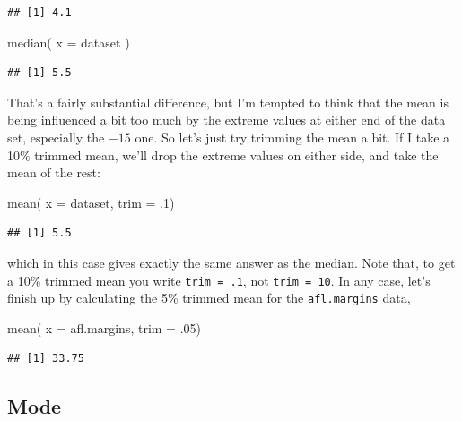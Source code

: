 \documentclass[
]{book}
\newenvironment{Shaded}{\begin{snugshade}}{\end{snugshade}}
\newcommand{\AttributeTok}[1]{\textcolor[rgb]{0.77,0.63,0.00}{#1}}
\newcommand{\DecValTok}[1]{\textcolor[rgb]{0.00,0.00,0.81}{#1}}
\newcommand{\FunctionTok}[1]{\textcolor[rgb]{0.00,0.00,0.00}{#1}}
\newcommand{\NormalTok}[1]{#1}
\begin{document}
\begin{verbatim}
## [1] 4.1
\end{verbatim}

\begin{Shaded}
\begin{Highlighting}[]
\FunctionTok{median}\NormalTok{( }\AttributeTok{x =}\NormalTok{ dataset )}
\end{Highlighting}
\end{Shaded}

\begin{verbatim}
## [1] 5.5
\end{verbatim}

That's a fairly substantial difference, but I'm tempted to think that the mean is being influenced a bit too much by the extreme values at either end of the data set, especially the \(-15\) one. So let's just try trimming the mean a bit. If I take a 10\% trimmed mean, we'll drop the extreme values on either side, and take the mean of the rest:

\begin{Shaded}
\begin{Highlighting}[]
\FunctionTok{mean}\NormalTok{( }\AttributeTok{x =}\NormalTok{ dataset, }\AttributeTok{trim =}\NormalTok{ .}\DecValTok{1}\NormalTok{)}
\end{Highlighting}
\end{Shaded}

\begin{verbatim}
## [1] 5.5
\end{verbatim}

which in this case gives exactly the same answer as the median. Note that, to get a 10\% trimmed mean you write \texttt{trim\ =\ .1}, not \texttt{trim\ =\ 10}. In any case, let's finish up by calculating the 5\% trimmed mean for the \texttt{afl.margins} data,

\begin{Shaded}
\begin{Highlighting}[]
\FunctionTok{mean}\NormalTok{( }\AttributeTok{x =}\NormalTok{ afl.margins, }\AttributeTok{trim =}\NormalTok{ .}\DecValTok{05}\NormalTok{)  }
\end{Highlighting}
\end{Shaded}

\begin{verbatim}
## [1] 33.75
\end{verbatim}

\hypertarget{mode}{%
\subsection{Mode}\label{mode}}
\end{document}
